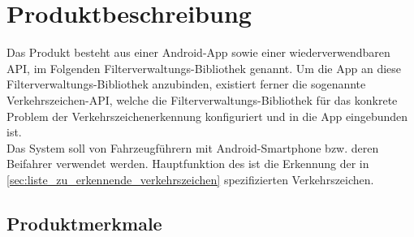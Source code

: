 \documentclass[12pt,a4paper,ngerman,enabledeprecatedfontcommands]{scrreprt}
\begin{document}
\section{Produktbeschreibung}
Das Produkt besteht aus einer Android-\gls{App} sowie einer wiederverwendbaren \gls{API}, im Folgenden \gls{Filterverwaltungs-Bibliothek} genannt. Um die \gls{App} an diese \gls{Filterverwaltungs-Bibliothek} anzubinden, existiert ferner die sogenannte \gls{Verkehrszeichen-API}, welche die \gls{Filterverwaltungs-Bibliothek} für das konkrete Problem der Verkehrszeichenerkennung konfiguriert und in die \gls{App} eingebunden ist.\\
Das \gls{System} soll von Fahrzeugführern mit Android-Smartphone bzw. deren Beifahrer verwendet werden. Hauptfunktion des  ist die Erkennung der in \cref{sec:liste_zu_erkennende_verkehrszeichen} spezifizierten Verkehrszeichen.\\

\subsection{Produktmerkmale}
\end{document}

